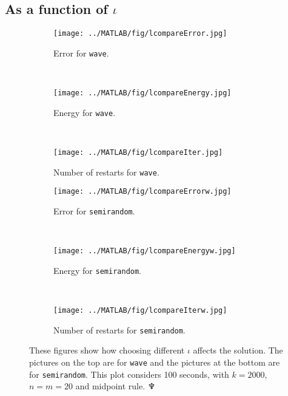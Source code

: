 \subsection{As a function of $\iota$}%
\begin{figure}[H]
        \centering
        \begin{subfigure}[b]{0.30\textwidth}
                \texttt{[image: ../MATLAB/fig/lcompareError.jpg]}
                \caption{ Error for \texttt{wave}. }
                \label{fig:lcompareError}
        \end{subfigure}
		~
        \begin{subfigure}[b]{0.30\textwidth}
                \texttt{[image: ../MATLAB/fig/lcompareEnergy.jpg]}
                \caption{ Energy for \texttt{wave}. }
                \label{fig:lcompareEnergy}
        \end{subfigure}
        ~
		\begin{subfigure}[b]{0.30\textwidth}
                \texttt{[image: ../MATLAB/fig/lcompareIter.jpg]}
                \caption{ Number of restarts for \texttt{wave}. }
                \label{fig:lcompareIter}
        \end{subfigure}
        
		\begin{subfigure}[b]{0.30\textwidth}
                \texttt{[image: ../MATLAB/fig/lcompareErrorw.jpg]}
                \caption{ Error for \texttt{semirandom}. }
                \label{fig:lcompareErrorw}
        \end{subfigure}
		~
		\begin{subfigure}[b]{0.30\textwidth}
                \texttt{[image: ../MATLAB/fig/lcompareEnergyw.jpg]}
                \caption{ Energy for \texttt{semirandom}. }
                \label{fig:lcompareEnergyw}
        \end{subfigure}
		~
		\begin{subfigure}[b]{0.30\textwidth}
                \texttt{[image: ../MATLAB/fig/lcompareIterw.jpg]}
                \caption{ Number of restarts for \texttt{semirandom}. }
                \label{fig:lcompareIterw}
        \end{subfigure}
        \caption{ These figures show how choosing different $\iota$ affects the solution. The pictures on the top are for \texttt{wave} and the pictures at the bottom are for \texttt{semirandom}. This plot considers 100 seconds, with $k = 2000$, $n = m = 20$ and midpoint rule. \hfill $\neptune$  }
        \label{fig:lcompare}
\end{figure}
